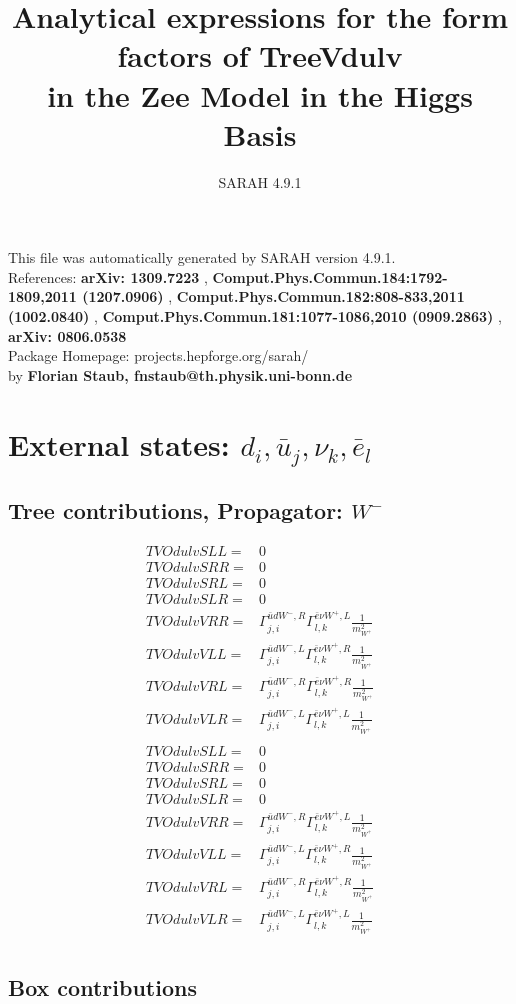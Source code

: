 \documentclass[A4,landscape]{article}
\begin{document}
\title{Analytical expressions for the form factors of TreeVdulv\\ in the Zee Model in the Higgs Basis } 
 \author{SARAH 4.9.1} 
 \maketitle 
 \vspace{10cm} 
This file was automatically generated by SARAH version 4.9.1.  \\ 
References: {\bf arXiv: 1309.7223 }, {\bf Comput.Phys.Commun.184:1792-1809,2011 (1207.0906) }, {\bf Comput.Phys.Commun.182:808-833,2011 (1002.0840) }, {\bf Comput.Phys.Commun.181:1077-1086,2010 (0909.2863) }, {\bf arXiv: 0806.0538 } \\ 
Package Homepage: projects.hepforge.org/sarah/ \\ 
by {\bf Florian Staub, fnstaub@th.physik.uni-bonn.de} 
 \pagebreak 
 \tableofcontents 
 \pagebreak 
\section{External states: ${d_{{i}}, \bar{u}_{{j}}, \nu_{{k}}, \bar{e}_{{l}}}$} 
\subsection{Tree contributions, Propagator: $W^-$} 

\begin{align} 
  TVOdulvSLL= & 0 \\ 
  TVOdulvSRR= & 0 \\ 
  TVOdulvSRL= & 0 \\ 
  TVOdulvSLR= & 0 \\ 
  TVOdulvVRR= & \Gamma^{\bar{u}d W^-,R}_{j, i} \Gamma^{\bar{e}\nu W^+ ,L}_{l, k} \frac{1}{m^2_{W^+}} \\ 
  TVOdulvVLL= & \Gamma^{\bar{u}d W^-,L}_{j, i} \Gamma^{\bar{e}\nu W^+ ,R}_{l, k} \frac{1}{m^2_{W^+}} \\ 
  TVOdulvVRL= & \Gamma^{\bar{u}d W^-,R}_{j, i} \Gamma^{\bar{e}\nu W^+ ,R}_{l, k} \frac{1}{m^2_{W^+}} \\ 
  TVOdulvVLR= & \Gamma^{\bar{u}d W^-,L}_{j, i} \Gamma^{\bar{e}\nu W^+ ,L}_{l, k} \frac{1}{m^2_{W^+}} \\ 
\end{align} 
\begin{align} 
  TVOdulvSLL= & 0 \\ 
  TVOdulvSRR= & 0 \\ 
  TVOdulvSRL= & 0 \\ 
  TVOdulvSLR= & 0 \\ 
  TVOdulvVRR= & \Gamma^{\bar{u}d W^-,R}_{j, i} \Gamma^{\bar{e}\nu W^+ ,L}_{l, k} \frac{1}{m^2_{W^+}} \\ 
  TVOdulvVLL= & \Gamma^{\bar{u}d W^-,L}_{j, i} \Gamma^{\bar{e}\nu W^+ ,R}_{l, k} \frac{1}{m^2_{W^+}} \\ 
  TVOdulvVRL= & \Gamma^{\bar{u}d W^-,R}_{j, i} \Gamma^{\bar{e}\nu W^+ ,R}_{l, k} \frac{1}{m^2_{W^+}} \\ 
  TVOdulvVLR= & \Gamma^{\bar{u}d W^-,L}_{j, i} \Gamma^{\bar{e}\nu W^+ ,L}_{l, k} \frac{1}{m^2_{W^+}} \\ 
\end{align} 
\subsection{Box contributions} 
\end{document}
